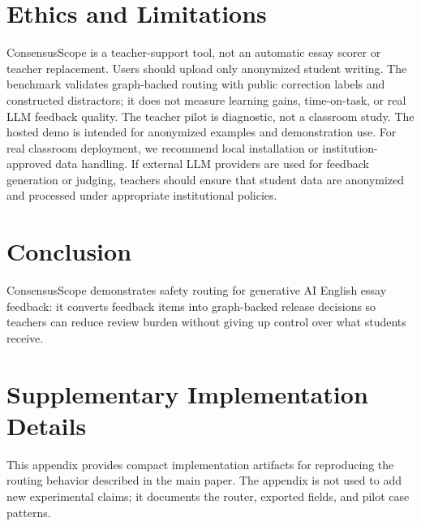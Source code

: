 \documentclass[11pt]{article}
\begin{document}
\section{Ethics and Limitations}

ConsensusScope is a teacher-support tool, not an automatic essay scorer or
teacher replacement. Users should upload only anonymized student writing. The
benchmark validates graph-backed routing with public correction labels and
constructed distractors; it does not measure learning gains, time-on-task, or
real LLM feedback quality. The teacher pilot is diagnostic, not a classroom
study. The hosted demo is intended for anonymized examples and demonstration
use. For real classroom deployment, we recommend local installation or
institution-approved data handling. If external LLM providers are used for
feedback generation or judging, teachers should ensure that student data are
anonymized and processed under appropriate institutional policies.

\section{Conclusion}

ConsensusScope demonstrates safety routing for generative AI English essay
feedback: it converts feedback items into graph-backed release decisions so
teachers can reduce review burden without giving up control over what students
receive.

\begingroup
\small

\endgroup

\appendix

\section{Supplementary Implementation Details}

This appendix provides compact implementation artifacts for reproducing the
routing behavior described in the main paper. The appendix is not used to add
new experimental claims; it documents the router, exported fields, and pilot
case patterns.
\end{document}
